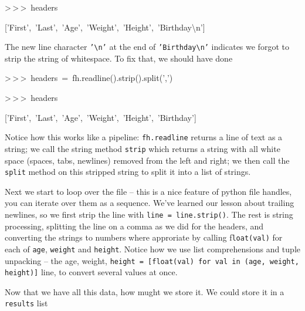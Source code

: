 \begin{lyxcode}
>\,{}>\,{}>~headers

{[}'First',~'Last',~'Age',~'Weight',~'Height',~'Birthday\textbackslash{}n']
\end{lyxcode}
The new line character \texttt{'\textbackslash{}n'} at the end of
\texttt{'Birthday\textbackslash{}n'} indicates we forgot to strip
the string of whitespace. To fix that, we should have done

\begin{lyxcode}
>\,{}>\,{}>~headers~=~fh.readline().strip().split(',')

>\,{}>\,{}>~headers

{[}'First',~'Last',~'Age',~'Weight',~'Height',~'Birthday']~
\end{lyxcode}
Notice how this works like a pipeline: \texttt{fh.readline} returns
a line of text as a string; we call the string method \texttt{strip}
which returns a string with all white space (spaces, tabs, newlines)
removed from the left and right; we then call the \texttt{split} method
on this stripped string to split it into a list of strings.

Next we start to loop over the file -- this is a nice feature of python
file handles, you can iterate over them as a sequence. We've learned
our lesson about trailing newlines, so we first strip the line with
\texttt{line = line.strip()}. The rest is string processing, splitting
the line on a comma as we did for the headers, and converting the
strings to numbers where approriate by calling f\texttt{loat(val)}
for each of \texttt{age}, \texttt{weight} and \texttt{height}. Notice
how we use list comprehensions and tuple unpacking -- the age, weight,
\texttt{height = {[}float(val) for val in (age, weight, height)]}
line, to convert several values at once.

Now that we have all this data, how mught we store it. We could store
it in a \texttt{results} list

